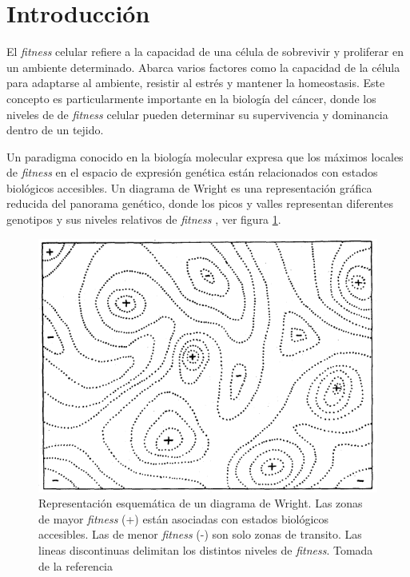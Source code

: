 \chapter*{Introducción} \label{intro}
\onehalfspacing

El \textit{fitness} celular refiere a la capacidad de una célula de sobrevivir y proliferar en un ambiente determinado. Abarca varios factores como la capacidad de la célula para adaptarse al ambiente, resistir al estrés y mantener la homeostasis. Este concepto es particularmente importante en la biología del cáncer, donde los niveles de de \textit{fitness} celular pueden determinar su supervivencia y dominancia dentro de un tejido.

Un paradigma conocido en la biología molecular expresa que los máximos locales de \textit{fitness} en el espacio de expresión genética están relacionados con estados biológicos accesibles. Un diagrama de Wright es una representación gráfica reducida del panorama genético, donde los picos y valles representan diferentes genotipos y sus niveles relativos de \textit{fitness} \cite{wright1932roles}, ver figura \ref{fig:wrightDiagram}. 

\begin{figure}[ht]
	\centering
	\includegraphics[scale=0.5]{figures/wright_diagram.png}
	\caption{Representación esquemática de un diagrama de Wright. Las zonas de mayor \textit{fitness} (+) están asociadas con estados biológicos accesibles. Las de menor \textit{fitness} (-) son solo zonas de transito. Las lineas discontinuas delimitan los distintos niveles de \textit{fitness}. Tomada de la referencia \cite{wright1932roles}}
	\label{fig:wrightDiagram}
\end{figure}

